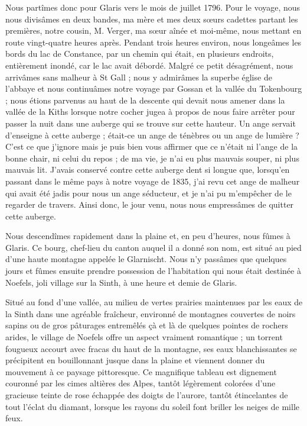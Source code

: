 \documentclass[11pt,a4paper]{report}
\begin{document}
\vspace{0.3cm}\hrulefill\vspace{0.3cm}

Nous partîmes donc pour Glaris vers le mois de juillet 1796. Pour le voyage, nous nous divisâmes en deux bandes, ma mère et mes deux sœurs cadettes partant les premières, notre cousin, M. Verger, ma sœur aînée et moi-même, nous mettant en route vingt-quatre heures après. Pendant trois heures environ, nous longeâmes les bords du lac de Constance, par un chemin qui était, en plusieurs endroits, entièrement inondé, car le lac avait débordé. Malgré ce petit désagrément, nous arrivâmes sans malheur à St Gall ; nous y admirâmes la superbe église de l'abbaye et nous continuâmes notre voyage par Gossan et la vallée du Tokenbourg ; nous étions parvenus au haut de la descente qui devait nous amener dans la vallée de la Kiths lorsque notre cocher jugea à propos de nous faire arrêter pour passer la nuit dans une auberge qui se trouve sur cette hauteur. Un ange servait d'enseigne à cette auberge ; était-ce un ange de ténèbres ou un ange de lumière ? C'est ce que j'ignore mais je puis bien vous affirmer que ce n'était ni l'ange de la bonne chair, ni celui du repos ; de ma vie, je n'ai eu plus mauvais souper, ni plus mauvais lit. J'avais conservé contre cette auberge dent si longue que, lorsqu'en passant dans le même pays à notre voyage de 1835, j'ai revu cet ange de malheur qui avait été jadis pour nous un ange séducteur, et je n'ai pu m'empêcher de le regarder de travers. Ainsi donc, le jour venu, nous nous empressâmes de quitter cette auberge.

Nous descendîmes rapidement dans la plaine et, en peu d'heures, nous fûmes à Glaris. Ce bourg, chef-lieu du canton auquel il a donné son nom, est situé au pied d'une haute montagne appelée le Glarnischt. Nous n'y passâmes que quelques jours et fûmes ensuite prendre possession de l'habitation qui nous était destinée à Noefels, joli village sur la Sinth, à une heure et demie de Glaris.

Situé au fond d'une vallée, au milieu de vertes prairies maintenues par les eaux de la Sinth dans une agréable fraîcheur, environné de montagnes couvertes de noirs sapins ou de gros pâturages entremêlés çà et là de quelques pointes de rochers arides, le village de Noefels offre un aspect vraiment romantique ; un torrent fougueux accourt avec fracas du haut de la montagne, ses eaux blanchissantes se précipitent en bouillonnant jusque dans la plaine et viennent donner du mouvement à ce paysage pittoresque. Ce magnifique tableau est dignement couronné par les cimes altières des Alpes, tantôt légèrement colorées d'une gracieuse teinte de rose échappée des doigts de l'aurore, tantôt étincelantes de tout l'éclat du diamant, lorsque les rayons du soleil font briller les neiges de mille feux.
\end{document}
